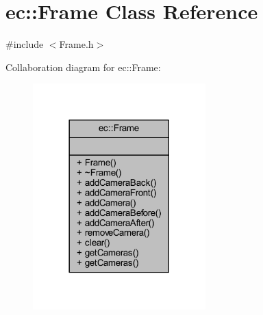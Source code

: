 \hypertarget{classec_1_1_frame}{}\section{ec\+:\+:Frame Class Reference}
\label{classec_1_1_frame}


{\ttfamily \#include $<$Frame.\+h$>$}



Collaboration diagram for ec\+:\+:Frame\+:\nopagebreak
\begin{figure}[H]
\begin{center}
\leavevmode
\includegraphics[width=189pt]{classec_1_1_frame__coll__graph}
\end{center}
\end{figure}
